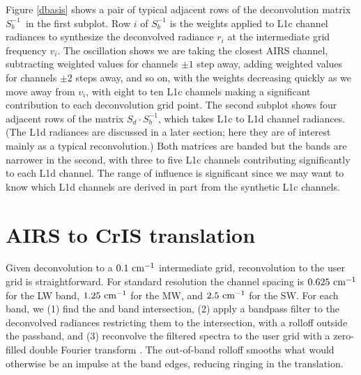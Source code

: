 \documentclass[10pt,twocolumn]{article}
\begin{document}


Figure \ref{dbasis} shows a pair of typical adjacent rows of the
deconvolution matrix $S_b^{-1}$\, in the first subplot.  Row $i$ of
$S_b^{-1}$ is the weights applied to L1c channel radiances to
synthesize the deconvolved radiance $r_i$ at the intermediate grid
frequency $v_i$.  The oscillation shows we are taking the closest
AIRS channel, subtracting weighted values for channels $\pm 1$ step
away, adding weighted values for channels $\pm 2$ steps away, and so
on, with the weights decreasing quickly as we move away from $v_i$,
with eight to ten L1c channels making a significant contribution to
each deconvolution grid point.  The second subplot shows four
adjacent rows of the matrix $S_d \cdot S_b^{-1}$, which takes L1c to
L1d channel radiances.  (The L1d radiances are discussed in a later
section; here they are of interest mainly as a typical
reconvolution.)  Both matrices are banded but the bands are narrower
in the second, with three to five L1c channels contributing
significantly to each L1d channel.  The range of influence is
significant since we may want to know which L1d channels are derived
in part from the synthetic L1c channels.

\section{AIRS to CrIS translation}
\label{airs2cris}

Given {\airs} deconvolution to a $0.1~\mbox{cm$^{-1}$}$ intermediate grid,
reconvolution to the {\cris} user grid is straightforward.  For
{\cris} standard resolution the channel spacing is $0.625~\mbox{cm$^{-1}$}$ 
for the LW band, $1.25~\mbox{cm$^{-1}$}$ for the MW, and $2.5~\mbox{cm$^{-1}$}$ for the SW.
For each {\cris} band, we (1) find the {\airs} and {\cris} band
intersection, (2) apply a bandpass filter to the deconvolved {\airs}
radiances restricting them to the intersection, with a rolloff
outside the passband, and (3) reconvolve the filtered spectra to 
the {\cris} user grid with a zero-filled double Fourier transform
\cite{git:finterp}.  The out-of-band rolloff smooths what would
otherwise be an impulse at the band edges, reducing ringing in the
translation.  
\end{document}
